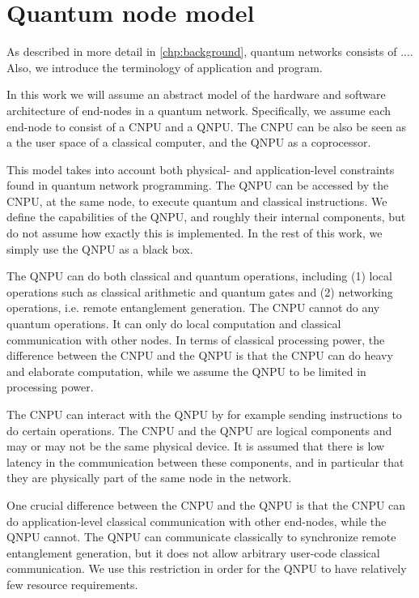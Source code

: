 \section{Quantum node model}
\label{sec:abstract_model}

As described in more detail in \cref{chp:background}, quantum networks consists of ....
Also, we introduce  the terminology of application and program.


In this work we will assume an abstract model of the hardware and software architecture of end-nodes in a quantum network.
Specifically, we assume each end-node to consist of a \acf{CNPU} and a \acf{QNPU}.
The \ac{CNPU} can be also be seen as a the user space of a classical computer, and the \ac{QNPU} as a coprocessor.

This model takes into account both physical- and application-level constraints found in quantum network programming.
The \ac{QNPU} can be accessed by the \ac{CNPU}, at the same node, to execute quantum and classical instructions.
We define the capabilities of the \ac{QNPU}, and roughly their internal components, but do not assume how exactly this is implemented.
In the rest of this work, we simply use the \ac{QNPU} as a black box.

The \ac{QNPU} can do both classical and quantum operations, including
    (1) local operations such as classical arithmetic and quantum gates and
    (2) networking operations, i.e. remote entanglement generation.
The \ac{CNPU} cannot do any quantum operations.
It can only do local computation and classical communication with other nodes.
In terms of classical processing power, the difference between the \ac{CNPU} and the \ac{QNPU} is that the \ac{CNPU} can do heavy and elaborate computation, while we assume the \ac{QNPU} to be limited in processing power.

The \ac{CNPU} can interact with the \ac{QNPU} by for example sending instructions to do certain operations.
The \ac{CNPU} and the \ac{QNPU} are logical components and may or may not be the same physical device.
It is assumed that there is low latency in the communication between these components, and in particular that they are physically part of the same node in the network.

One crucial difference between the \ac{CNPU} and the \ac{QNPU} is that the \ac{CNPU} can do application-level classical communication with other end-nodes, while the \ac{QNPU} cannot.
The \ac{QNPU} can communicate classically to synchronize remote entanglement generation, but it does not allow arbitrary user-code classical communication.
We use this restriction in order for the \ac{QNPU} to have relatively few resource requirements.

